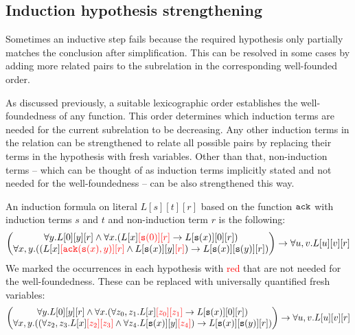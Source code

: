 \subsection{Induction hypothesis strengthening}
Sometimes an inductive step fails because the required hypothesis only partially matches the conclusion after simplification. This can be resolved in some cases by adding more related pairs to the subrelation in the corresponding well-founded order.

As discussed previously, a suitable lexicographic order establishes the well-foundedness of any function. This order determines which induction terms are needed for the current subrelation to be decreasing. Any other induction terms in the relation can be strengthened to relate all possible pairs by replacing their terms in the hypothesis with fresh variables. Other than that, non-induction terms -- which can be thought of as induction terms implicitly stated and not needed for the well-foundedness -- can be also strengthened this way.

\begin{example}
	An induction formula on literal $L[s][t][r]$ based on the function $\mathtt{ack}$ with induction terms $s$ and $t$ and non-induction term $r$ is the following:
	$$\begin{pmatrix}\forall y.L[0][y][r]\land \forall x.(L[x]\textcolor{red}{[\mathtt{s}(0)][r]}\rightarrow L[\mathtt{s}(x)][0][r])\\
	\forall x,y.((L[x]\textcolor{red}{[\mathtt{ack}(\mathtt{s}(x),y)][r]}\land L[\mathtt{s}(x)][y]\textcolor{red}{[r]})\rightarrow L[\mathtt{s}(x)][\mathtt{s}(y)][r])\end{pmatrix}\rightarrow \forall u,v.L[u][v][r]$$
	We marked the occurrences in each hypothesis with \textcolor{red}{red} that are not needed for the well-foundedness. These can be replaced with universally quantified fresh variables:
	$$\begin{pmatrix}\forall y.L[0][y][r]\land \forall x.(\forall z_0,z_1.L[x]\textcolor{red}{[z_0][z_1]}\rightarrow L[\mathtt{s}(x)][0][r])\\
	\forall x,y.((\forall z_2,z_3.L[x]\textcolor{red}{[z_2][z_3]}\land \forall z_4.L[\mathtt{s}(x)][y]\textcolor{red}{[z_4]})\rightarrow L[\mathtt{s}(x)][\mathtt{s}(y)][r])\end{pmatrix}\rightarrow \forall u,v.L[u][v][r]$$
\end{example}

